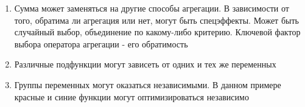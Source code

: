 \begin{enumerate}
    \item Сумма может заменяться на другие способы агрегации. В зависимости от того, обратима ли агрегация или нет, могут быть спецэффекты. Может быть случайный выбор, объединение по какому-либо критерию. Ключевой фактор выбора оператора агрегации - его обратимость
    \item Различные подфункции могут зависеть от одних и тех же переменных
    \item Группы переменных могут оказаться независимыми. В данном примере красные и синие функции могут оптимизироваться независимо\\
\end{enumerate}
